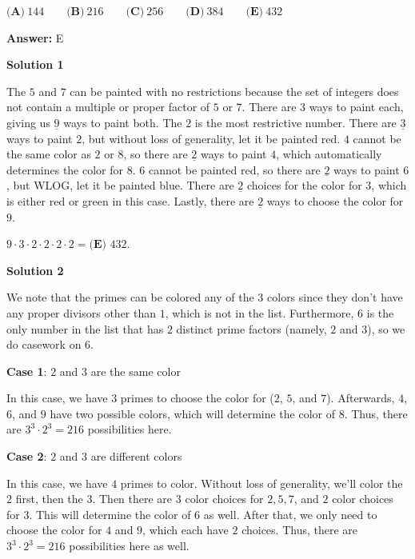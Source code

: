 \begin{enumerate}
 $\textbf{(A)}\ 144\qquad\textbf{(B)}\ 216\qquad\textbf{(C)}\ 256\qquad\textbf{(D)}\ 384\qquad\textbf{(E)}\ 432$

 \textbf{Answer: }E



\textbf{Solution 1}

The $5$ and $7$ can be painted with no restrictions because the set of integers does not contain a multiple or proper factor of $5$ or $7$. There are 3 ways to paint each, giving us $\underline{9}$ ways to paint both. The $2$ is the most restrictive number. There are $\underline{3}$ ways to paint $2$, but without loss of generality, let it be painted red. $4$ cannot be the same color as $2$ or $8$, so there are $\underline{2}$ ways to paint $4$, which automatically determines the color for $8$. $6$ cannot be painted red, so there are $\underline{2}$ ways to paint $6$, but WLOG, let it be painted blue. There are $\underline{2}$ choices for the color for $3$, which is either red or green in this case. Lastly, there are $\underline{2}$ ways to choose the color for $9$.

 $9 \cdot 3 \cdot 2 \cdot 2 \cdot 2 \cdot 2 = \boxed{\textbf{(E) }432}$.

 



\textbf{Solution 2}

We note that the primes can be colored any of the $3$ colors since they don't have any proper divisors other than $1$, which is not in the list. Furthermore, $6$ is the only number in the list that has $2$ distinct prime factors (namely, $2$ and $3$), so we do casework on $6$. 

 \textbf{Case 1}: $2$ and $3$ are the same color

 In this case, we have $3$ primes to choose the color for ($2$, $5$, and $7$). Afterwards, $4$, $6$, and $9$ have two possible colors, which will determine the color of $8$. Thus, there are $3^3\cdot 2^3=216$ possibilities here. 

 \textbf{Case 2}: $2$ and $3$ are different colors

 In this case, we have $4$ primes to color. Without loss of generality, we'll color the $2$ first, then the $3$. Then there are $3$ color choices for $2,5,7$, and $2$ color choices for $3$. This will determine the color of $6$ as well. After that, we only need to choose the color for $4$ and $9$, which each have $2$ choices. Thus, there are $3^3\cdot 2^3=216$ possibilities here as well. 


\end{enumerate}
